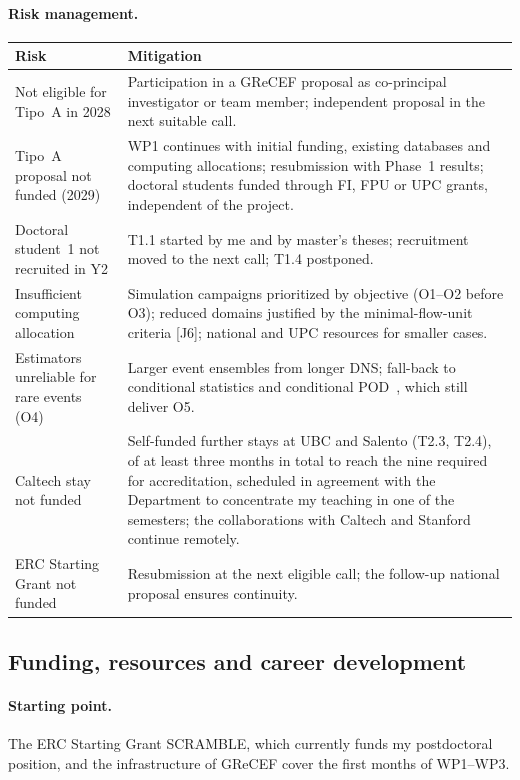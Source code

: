\documentclass[11pt]{article}
\begin{document}
\paragraph{Risk management.}
\begin{center}\small
\begin{tabularx}{\textwidth}{@{}>{\raggedright\arraybackslash}p{4.4cm}X@{}}
\toprule
\textbf{Risk} & \textbf{Mitigation} \\
\midrule
Not eligible for Tipo~A in 2028 & Participation in a GReCEF proposal as co-principal investigator or team member; independent proposal in the next suitable call. \\
Tipo~A proposal not funded (2029) & WP1 continues with initial funding, existing databases and computing allocations; resubmission with Phase~1 results; doctoral students funded through FI, FPU or UPC grants, independent of the project. \\
Doctoral student~1 not recruited in Y2 & T1.1 started by me and by master's theses; recruitment moved to the next call; T1.4 postponed. \\
Insufficient computing allocation & Simulation campaigns prioritized by objective (O1--O2 before O3); reduced domains justified by the minimal-flow-unit criteria [J6]; national and UPC resources for smaller cases. \\
Estimators unreliable for rare events (O4) & Larger event ensembles from longer DNS; fall-back to conditional statistics and conditional POD~\cite{Martin2025}, which still deliver O5. \\
Caltech stay not funded & Self-funded further stays at UBC and Salento (T2.3, T2.4), of at least three months in total to reach the nine required for accreditation, scheduled in agreement with the Department to concentrate my teaching in one of the semesters; the collaborations with Caltech and Stanford continue remotely. \\
ERC Starting Grant not funded & Resubmission at the next eligible call; the follow-up national proposal ensures continuity. \\
\bottomrule
\end{tabularx}
\end{center}

\subsection{Funding, resources and career development}\label{sec:resources}
\paragraph{Starting point.} The ERC Starting Grant SCRAMBLE, which currently funds my
postdoctoral position, and the infrastructure of GReCEF cover the first months of WP1--WP3.
\end{document}
